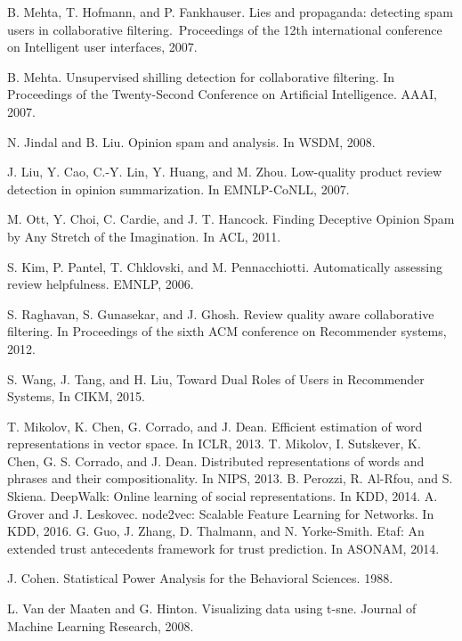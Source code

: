 \documentclass[master,english,final]{kaist-ucs}
\begin{document}
\begin{thebibliography}{00}
 B. Mehta, T. Hofmann, and P. Fankhauser. Lies and propaganda: detecting spam users in collaborative filtering. Proceedings of the 12th international conference on Intelligent user interfaces, 2007.

 B. Mehta. Unsupervised shilling detection for collaborative filtering. In Proceedings of the Twenty-Second Conference on Artificial Intelligence. AAAI, 2007.

 N. Jindal and B. Liu. Opinion spam and analysis. In WSDM, 2008.

 J. Liu, Y. Cao, C.-Y. Lin, Y. Huang, and M. Zhou. Low-quality product review detection in opinion summarization. In EMNLP-CoNLL, 2007.


 M. Ott, Y. Choi, C. Cardie, and J. T. Hancock. Finding Deceptive Opinion Spam by Any Stretch of the Imagination. In ACL, 2011.

 S. Kim, P. Pantel, T. Chklovski, and M. Pennacchiotti. Automatically assessing review helpfulness. EMNLP, 2006.

 S. Raghavan, S. Gunasekar, and J. Ghosh. Review quality aware collaborative filtering. In Proceedings of the sixth ACM conference on Recommender systems, 2012.

 S. Wang, J. Tang, and H. Liu, Toward Dual Roles of Users in Recommender Systems, In CIKM, 2015.

 T. Mikolov, K. Chen, G. Corrado, and J. Dean. Efficient estimation of word representations in vector space. In ICLR, 2013.
 T. Mikolov, I. Sutskever, K. Chen, G. S. Corrado, and J. Dean. Distributed representations of words and phrases and their compositionality. In NIPS, 2013.
 B. Perozzi, R. Al-Rfou, and S. Skiena. DeepWalk: Online learning of social representations. In KDD, 2014.
 A. Grover and J. Leskovec. node2vec: Scalable Feature Learning for Networks. In KDD, 2016.
 G. Guo, J. Zhang, D. Thalmann, and N. Yorke-Smith. Etaf: An extended trust antecedents framework for trust prediction. In ASONAM, 2014.

  J. Cohen. Statistical Power Analysis for the Behavioral Sciences. 1988.

 L. Van der Maaten and G. Hinton. Visualizing data using t-sne. Journal of Machine Learning Research, 2008.

\end{thebibliography}
\end{document}

